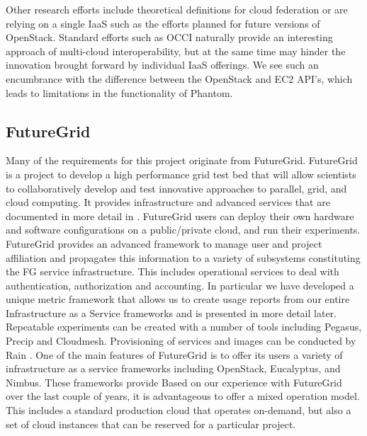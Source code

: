 \documentclass{tex/sig-alternate-2013}
\newcommand{\todo}[1]{{\color{red}{#1}}}
\newcommand{\READ}{\todo{READ}}
\begin{document}
Other research efforts include theoretical definitions for cloud federation \cite{kurze2011cloudfederation} or are relying on a single IaaS such as the efforts planned for future versions of OpenStack. Standard efforts such as OCCI naturally provide an interesting approach of multi-cloud interoperability, but at the same time may hinder the innovation brought forward by individual IaaS offerings. We see such an encumbrance with the difference between the OpenStack and EC2 API's, which leads to limitations in the functionality of Phantom.


\subsection{FutureGrid \READ}

Many of the requirements for this project originate from
FutureGrid. FutureGrid \cite{las2010gce,las12fg-bookchapter} is a
project to develop a high performance grid test bed that will allow
scientists to collaboratively develop and test innovative approaches
to parallel, grid, and cloud computing. It provides infrastructure and
advanced services that are documented in more detail in
\cite{vonLaszewski-bigdata-bookchapter2014} . FutureGrid users can
deploy their own hardware and software configurations on a
public/private cloud, and run their experiments. FutureGrid provides
an advanced framework to manage user and project affiliation and
propagates this information to a variety of subsystems constituting
the FG service infrastructure. This includes operational services to
deal with authentication, authorization and accounting. In particular
we have developed a unique metric framework
\cite{las08federated-cloud} that allows us to create usage reports
from our entire Infrastructure as a Service frameworks and is
presented in more detail later. Repeatable experiments can be created
with a number of tools including Pegasus, Precip and
Cloudmesh. Provisioning of services and images can be conducted by
Rain \cite{imagemanagement,fg-1295}.
One of the main features of FutureGrid is to offer its users a variety
of infrastructure as a service frameworks
\cite{comparisoncloud} including OpenStack, Eucalyptus,
and Nimbus. These frameworks provide Based on our experience with
FutureGrid over the last couple of years, it is advantageous to offer
a mixed operation model. This includes a standard production cloud
that operates on-demand, but also a set of cloud instances that can be
reserved for a particular project. 
\end{document}
